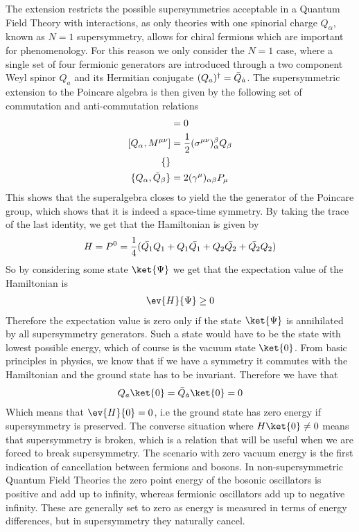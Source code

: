The extension restricts the possible supersymmetries acceptable in a Quantum Field Theory with interactions, as only theories with one spinorial charge $Q_{\alpha}$, known as $N=1$ supersymmetry, allows for chiral fermions which are important for phenomenology. For this reason we only consider the $N=1$ case, where a single set of four fermionic generators are introduced through a two component Weyl spinor $Q_{a}$ and its Hermitian conjugate $(Q_{a})^{\dagger}=\Bar{Q}_{\dot{a}}$. The supersymmetric extension to the Poincare algebra is then given by the following set of commutation and anti-commutation relations
\begin{align*}
    [P_{\mu},Q_{\alpha}]&=0
    \\
    [Q_{\alpha},M^{\mu\nu}]&=\frac{1}{2}(\sigma^{\mu\nu})_{\alpha}^{\beta}Q_{\beta}
    \\
    \{\}
    \\
    \{Q_{\alpha},\Bar{Q}_{\beta}\}&=2(\gamma^{\mu})_{\alpha\beta}P_{\mu}
\end{align*}
This shows that the superalgebra closes to yield the the generator of the Poincare group, which shows that it is indeed a space-time symmetry. By taking the trace of the last identity, we get that the Hamiltonian is given by
\begin{align*}
    H=P^{0}=\frac{1}{4}(\Bar{Q_{1}}Q_{1}+Q_{1}\Bar{Q_{1}}+Q_{2}\Bar{Q_{2}}+\Bar{Q_{2}}Q_{2})
\end{align*}
So by considering some state $\ket{\Psi}$ we get that the expectation value of the Hamiltonian is
\begin{align*}
    \ev{H}{\Psi}\geq 0
\end{align*}
Therefore the expectation value is zero only if the state $\ket{\Psi}$ is annihilated by all supersymmetry generators. Such a state would have to be the state with lowest possible energy, which of course is the vacuum state $\ket{0}$. From basic principles in physics, we know that if we have a symmetry it commutes with the Hamiltonian and the ground state has to be invariant. Therefore we have that
\begin{align}
    Q_{a}\ket{0}=\Bar{Q}_{\dot{a}}\ket{0}=0
\end{align}
Which means that $\ev{H}{0}=0$, i.e the ground state has zero energy if supersymmetry is preserved. The converse situation where $H\ket{0}\neq0$ means that supersymmetry is broken, which is a relation that will be useful when we are forced to break supersymmetry. The scenario with zero vacuum energy is the first indication of cancellation between fermions and bosons. In non-supersymmetric Quantum Field Theories the zero point energy of the bosonic oscillators is positive and add up to infinity, whereas fermionic oscillators add up to negative infinity. These are generally set to zero as energy is measured in terms of energy differences, but in supersymmetry they naturally cancel.
\medskip

